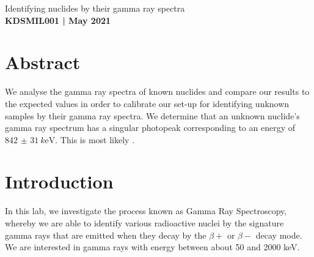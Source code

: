 \documentclass[11pt]{article}
\numberwithin{equation}{section}
\numberwithin{figure}{section}
\numberwithin{table}{section}
\begin{document}
    \begin{center}
        {\huge Identifying nuclides by their gamma ray spectra}\\
        \vspace{0.2in}
        \textbf{KDSMIL001 | May 2021}
        
        \section*{Abstract}\label{sec:Abstract}
        We analyse the gamma ray spectra of known nuclides and compare our results to the expected values in order to calibrate our set-up for identifying unknown samples by their gamma ray spectra. We determine that an unknown nuclide's gamma ray spectrum has a singular photopeak corresponding to an energy of $\SI{842(31)}{k\electronvolt}$. This is most likely .
    \end{center}

    \section{Introduction}\label{sec:Introduction}
    \par In this lab, we investigate the process known as Gamma Ray Spectroscopy, whereby we are able to identify various radioactive nuclei by the signature gamma rays that are emitted when they decay by the $\beta+$ or $\beta-$ decay mode. We are interested in gamma rays with energy between about 50 and 2000 keV.
\end{document}
